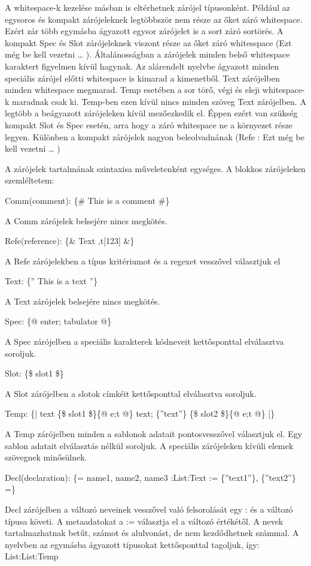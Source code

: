 A whitespace-k kezelése másban is eltérhetnek zárójel típusonként. Például az egysoros és kompakt zárójeleknek legtöbbször nem része az őket záró whitespace. Ezért zár több egymásba ágyazott egysor zárójelet is a sort záró sortörés. A kompakt Spec és Slot zárójeleknek viszont része az őket záró whitesspace (Ezt még be kell vezetni … ). Általánosságban a zárójelek minden belső whitespace karaktert figyelmen kívül hagynak. Az alárendelt nyelvbe ágyazott minden speciális zárójel előtti whitespace is kimarad a kimenetből. Text zárójelben minden whitespace megmarad. Temp esetében a sor törő, végi és eleji whitespace-k maradnak csak ki. Temp-ben ezen kívül nincs minden szöveg Text zárójelben. A legtöbb a beágyazott zárójeleken kívül mezőezkedik el. Éppen ezért van szükség kompakt Slot és Spec esetén, arra hogy a záró whitespace ne a környezet része legyen. Különben a kompakt zárójelek nagyon beleolvadnának (Refe : Ezt még be kell vezetni … )

A zárójelek tartalmának szintaxisa műveletenként egységes. A blokkos zárójeleken szemléltetem:

Comm(comment): \{\# This is a comment \#\}

A Comm zárójelek belsejére nincs megkötés.

Refe(reference): \{\& Text ,t[123] \&\}

A Refe zárójelekben a típus kritériumot és a regexet vesszővel választjuk el

Text: \{” This is a text ”\}

A Text zárójelek belsejére nincs megkötés.

Spec: \{@ enter; tabulator @\}

A Spec zárójelben a speciális karakterek kódneveit kettősponttal elválasztva soroljuk.

Slot: \{\$ slot1 \$\}

A Slot zárójelben a slotok címkéit kettősponttal elválasztva soroljuk.

Temp: \{| text \{\$ slot1 \$\}\{@ e;t @\} text; \{”text”\} \{\$ slot2 \$\}\{@ e;t @\} |\}

A Temp zárójelben minden a sablonok adatait pontosvesszővel választjuk el. Egy sablon adatait elválasztás nélkül soroljuk. A speciális zárójeleken kívüli elemek szövegnek minősülnek.

Decl(declaration): \{= name1, name2, name3 :List:Text := \{”text1”\}, \{”text2”\} =\}

Decl zárójelben a változó neveinek vesszővel való felsorolását egy : és a változó típusa követi. A metaadatokat a := választja el a változó értékétől. A nevek tartalmazhatnak betűt, számot és alulvonást, de nem kezdődhetnek számmal. A nyelvben az egymásba ágyazott típusokat kettősponttal tagoljuk, így: List:List:Temp

